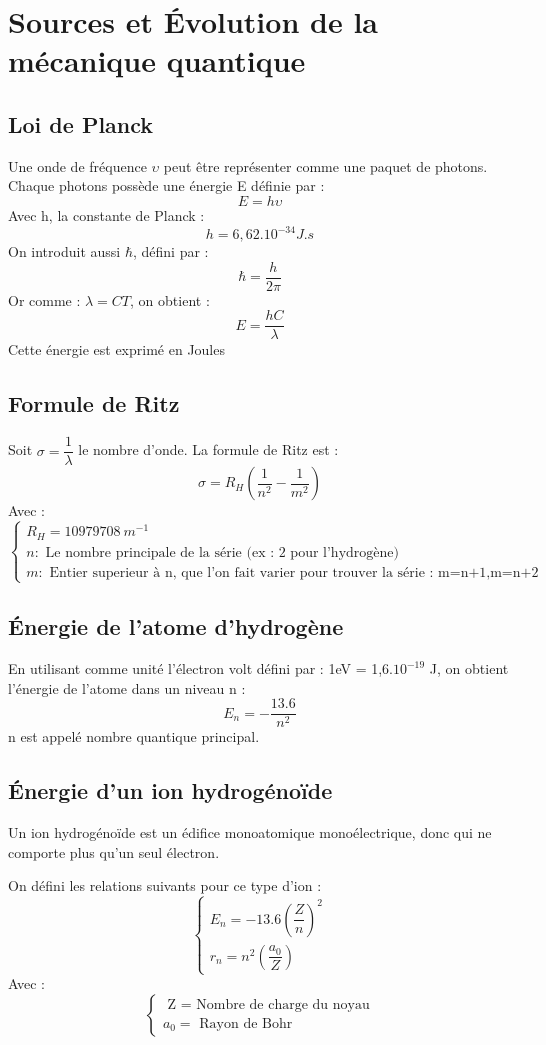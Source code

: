 \chapter{Sources et Évolution de la mécanique quantique}
\section{Loi de Planck}
\begin{de}
Une onde de fréquence $\upsilon$ peut être représenter comme une paquet de photons. Chaque photons possède une énergie E définie par :
$$E = h\upsilon$$
Avec h, la constante de Planck :
$$h=6,62.10^{-34} J.s$$
On introduit aussi $\hbar$, défini par : 
$$\hbar = \dfrac{h}{2\pi}$$
Or comme : $\lambda = CT$, on obtient : 
$$E = \dfrac{hC}{\lambda}$$
Cette énergie est exprimé en Joules
\end{de}
\section{Formule de Ritz}
Soit $\sigma=\dfrac{1}{\lambda}$ le nombre d'onde. La formule de Ritz est : 
$$\sigma = R_H(\dfrac{1}{n^2}-\dfrac{1}{m^2})$$
Avec :
\[\left\{\begin{array}{l}
  R_H = 10979708~ m^{-1}\\
  n : \mbox{ Le nombre principale de la série (ex : 2 pour l'hydrogène)}\\
  m : \mbox{ Entier superieur à n, que l'on fait varier pour trouver la série : m=n+1,m=n+2 .... }
  \end{array}\right.
\]
\section{Énergie de l'atome d'hydrogène}
\begin{de}
 En utilisant comme unité l'électron volt défini par : 1eV = 1,6.$10^{-19}$ J, on obtient l'énergie de l'atome dans un niveau n :
$$E_n = -\dfrac{13.6}{n^2}$$
n est appelé nombre quantique principal.
\end{de}
\section{Énergie d'un ion hydrogénoïde}
\begin{de}
 Un ion hydrogénoïde est un édifice monoatomique monoélectrique, donc qui ne comporte plus qu'un seul électron.
\end{de}
On défini les relations suivants pour ce type d'ion :
\[\left\{\begin{array}{c}
  E_n = -13.6\left(\dfrac{Z}{n}\right)^2 \\
  r_n = n^2\left(\dfrac{a_0}{Z}\right) 
  \end{array}\right.
\]
Avec :
\[\left\{\begin{array}{l}
   \mbox{ Z = Nombre de charge du noyau} \\
   a_0 = \mbox{ Rayon de Bohr }
  \end{array}\right.
\]
